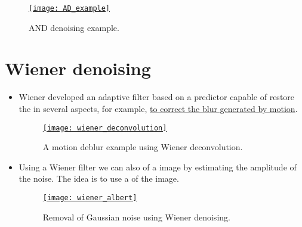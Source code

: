 \begin{figure}[H]
  \vspace{-0ex}
  \centering
    \href{https://es.mathworks.com/help/images/ref/imdiffusefilt.html}{\texttt{[image: AD\_example]}}
  \caption{\gls{AND} denoising example.}
  \label{fig:AND_denoising_example}
\end{figure}

\section{Wiener denoising \cite{gonzalez2009digital}}
\begin{itemize}
\item Wiener developed an adaptive filter based on a predictor capable
  of restore the  in several
  aspects, for example,
  \href{https://docs.opencv.org/3.4/d1/dfd/tutorial_motion_deblur_filter.html}{to
    correct the blur generated by motion}.
  \begin{figure}[H]
    \vspace{2ex}
    \centering
    \href{https://docs.opencv.org/3.4/white_car.jpg}{\texttt{[image: wiener\_deconvolution]}}
    \caption{A motion deblur example using Wiener deconvolution.}
    \label{fig:Motion_deblur}
  \end{figure}
\end{itemize}

\begin{itemize}
\item Using a Wiener filter we can also   of a image by
  estimating the amplitude of the noise. The idea is to use a
    of the
  image.
  \begin{figure}[H]
    \vspace{2ex}
    \centering
    \href{https://www.techscience.com/csse/v45n2/50440/html}{\texttt{[image: wiener\_albert]}}
    \caption{Removal of Gaussian noise using Wiener denoising.}
    \label{fig:Wiener_denoising}
  \end{figure}
\end{itemize}

